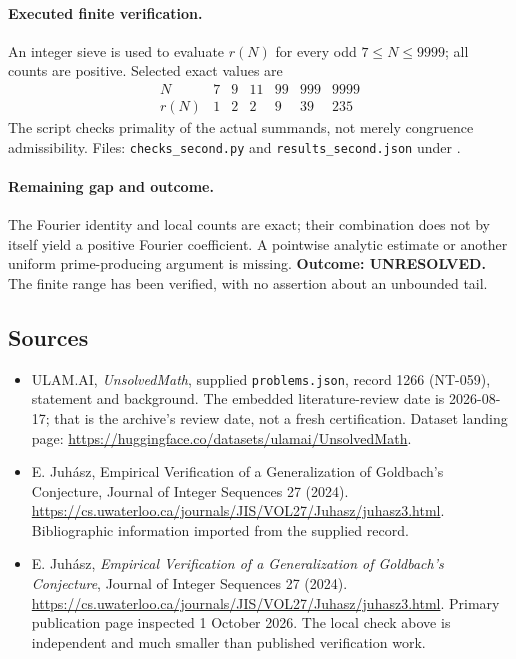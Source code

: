 \documentclass[11pt,a4paper]{article}
\begin{document}
\paragraph{Executed finite verification.}
An integer sieve is used to evaluate $r(N)$ for every odd
$7\le N\le9999$; all counts are positive. Selected exact values are
\[
\begin{array}{c|rrrrrr}
 N&7&9&11&99&999&9999\\\hline
 r(N)&1&2&2&9&39&235
\end{array}
\]
The script checks primality of the actual summands, not merely
congruence admissibility. Files: \texttt{checks\_second.py} and
\texttt{results\_second.json} under
.

\paragraph{Remaining gap and outcome.}
The Fourier identity and local counts are exact; their combination
does not by itself yield a positive Fourier coefficient. A pointwise
analytic estimate or another uniform prime-producing argument is
missing. \textbf{Outcome: UNRESOLVED.} The finite range has been
verified, with no assertion about an unbounded tail.

\subsection{Sources}

{\small

\begin{itemize}

\item[\hypertarget{source:1266:1}{S1}] ULAM.AI, \emph{UnsolvedMath}, supplied \texttt{problems.json}, record 1266 (NT-059), statement and background. The embedded literature-review date is 2026-08-17; that is the archive’s review date, not a fresh certification. Dataset landing page: \url{https://huggingface.co/datasets/ulamai/UnsolvedMath}.

\item[\hypertarget{source:1266:2}{S2}] E. Juhász, Empirical Verification of a Generalization of Goldbach's Conjecture, Journal of Integer Sequences 27 (2024). \url{https://cs.uwaterloo.ca/journals/JIS/VOL27/Juhasz/juhasz3.html}. Bibliographic information imported from the supplied record.


\item[E1] E. Juh\'asz, \emph{Empirical Verification of a Generalization
of Goldbach's Conjecture}, Journal of Integer Sequences 27 (2024).
\url{https://cs.uwaterloo.ca/journals/JIS/VOL27/Juhasz/juhasz3.html}.
Primary publication page inspected 1 October 2026. The local check above
is independent and much smaller than published verification work.

\end{itemize}

}

\label{end:1266}
\end{document}

